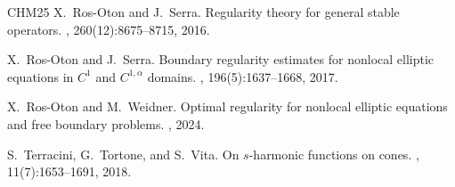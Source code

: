 \documentclass[11pt]{amsart}
\theoremstyle{plain}
\theoremstyle{definition}
\numberwithin{equation}{section}
\begin{document}
\begin{thebibliography}{CHM{\etalchar{+}}25}
X.~Ros-Oton and J.~Serra.
\newblock Regularity theory for general stable operators.
, 260(12):8675--8715, 2016.

X.~Ros-Oton and J.~Serra.
\newblock Boundary regularity estimates for nonlocal elliptic equations in
  {$C^1$} and {$C^{1,\alpha}$} domains.
, 196(5):1637--1668, 2017.

X.~Ros-Oton and M.~Weidner.
\newblock Optimal regularity for nonlocal elliptic equations and free boundary
  problems.
, 2024.

S.~Terracini, G.~Tortone, and S.~Vita.
\newblock On {$s$}-harmonic functions on cones.
, 11(7):1653--1691, 2018.

\end{thebibliography}

%

% 
% 
\end{document}
